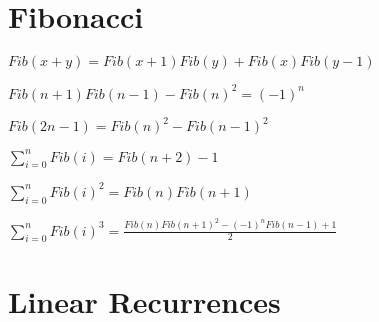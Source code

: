 \section{Fibonacci}
\newcommand{\Fib}{\mathit{Fib}}
$\Fib(x + y) = \Fib(x + 1) \Fib(y) + \Fib(x) \Fib(y - 1)$

$\Fib(n+1)\Fib(n-1) - \Fib(n)^2 = (-1)^n$

$\Fib(2n-1) = \Fib(n)^2 - \Fib(n-1)^2$

$ \sum_{i=0}^{n} \Fib(i) = \Fib(n+2) - 1$

$ \sum_{i=0}^{n} \Fib(i)^2 = \Fib(n)\Fib(n+1)$

$ \sum_{i=0}^{n} \Fib(i)^3 = \frac{\Fib(n)\Fib(n+1)^2 - (-1)^n\Fib(n-1) + 1}{2}$

\section{Linear Recurrences}
\iffalse
  \item $F_n = F_{n-1} + F_{n-2}$\\

$\begin{bmatrix}
  0 & 1\\
  1 & 1
  \end{bmatrix} 
  \begin{bmatrix}
  F_0\\
  F_1
  \end{bmatrix} =
  \begin{bmatrix}
    F_1\\
    F_2
  \end{bmatrix}$

\item $F_i = \sum_{j=1}^{K} C_j F_{i-j}$\\


{   
  \scriptsize
  $\begin{bmatrix}
    0 & 1 & 0 & 0 & . & 0\\
    0 & 0 & 1 & 0 & . & 0\\
    0 & 0 & 0 & 1 & . & 0\\
    . & . & . & . & . & .\\
    C_K & C_{K-1} & C_{K-2} & C_{K-3} & . & C_{1}
  \end{bmatrix} 
  \begin{bmatrix}
  F_0\\
  F_1\\
  F_2\\
  .\\
  F_{K-1}
  \end{bmatrix} =
  \begin{bmatrix}
    F_1\\
    F_2\\
    F_3\\
    .\\
    F_K
\end{bmatrix}$
}
\fi

